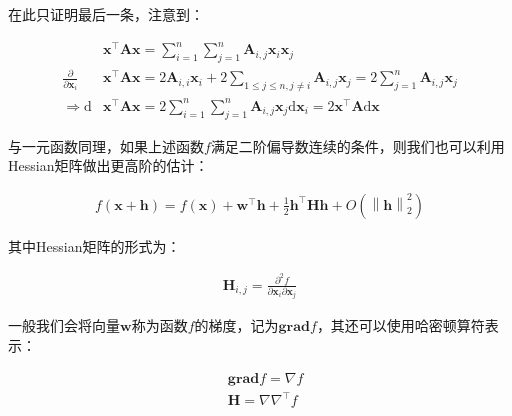 \documentclass[UTF8]{book}
\begin{document}
在此只证明最后一条，注意到：
\begin{large}
    \begin{equation}
        \begin{aligned}
            &\mathbf{x}^\top \mathbf{A} \mathbf{x}=\sum_{i=1}^{n}\sum_{j=1}^{n}\mathbf{A}_{i,j}\mathbf{x}_i\mathbf{x}_j \\
            \frac{\partial}{\partial \mathbf{x}_i}&\mathbf{x}^\top \mathbf{A} \mathbf{x}=2\mathbf{A}_{i,i}\mathbf{x}_i+2\sum_{1 \le j \le n, j\not = i}{\mathbf{A}_{i,j}\mathbf{x}_j}=2\sum_{j=1}^{n}\mathbf{A}_{i,j}\mathbf{x}_j \\
            \Rightarrow \mathrm{d}&\mathbf{x}^\top \mathbf{A} \mathbf{x}=2\sum_{i=1}^{n}{\sum_{j=1}^{n}\mathbf{A}_{i,j}\mathbf{x}_j\mathrm{d}\mathbf{x}_i}=2\mathbf{x}^\top \mathbf{A}\mathrm{d}\mathbf{x}
            \nonumber
        \end{aligned}
    \end{equation}
\end{large}
与一元函数同理，如果上述函数$f$满足二阶偏导数连续的条件，则我们也可以利用Hessian矩阵做出更高阶的估计：
\begin{large}
    \begin{equation}
        \begin{aligned}
            f(\mathbf{x}+\mathbf{h})=f(\mathbf{x})+\mathbf{w}^\top \mathbf{h}+\frac{1}{2}\mathbf{h}^\top \mathbf{H}\mathbf{h}+O(\left \| \mathbf{h} \right \|_2^2)
            \nonumber
        \end{aligned}
    \end{equation}
\end{large}
其中Hessian矩阵的形式为：
\begin{large}
    \begin{equation}
        \begin{aligned}
            \mathbf{H}_{i,j}=\frac{\partial^2f}{\partial\mathbf{x}_i\partial\mathbf{x}_j}
            \nonumber
        \end{aligned}
    \end{equation}
\end{large}
一般我们会将向量$\mathbf{w}$称为函数$f$的梯度，记为$\mathbf{grad}f$，其还可以使用哈密顿算符表示：
\begin{large}
    \begin{equation}
        \begin{aligned}
            &\mathbf{grad}f=\nabla f \\
            &\mathbf{H}=\nabla \nabla^\top f
            \nonumber
        \end{aligned}
    \end{equation}
\end{large}
\end{document}
